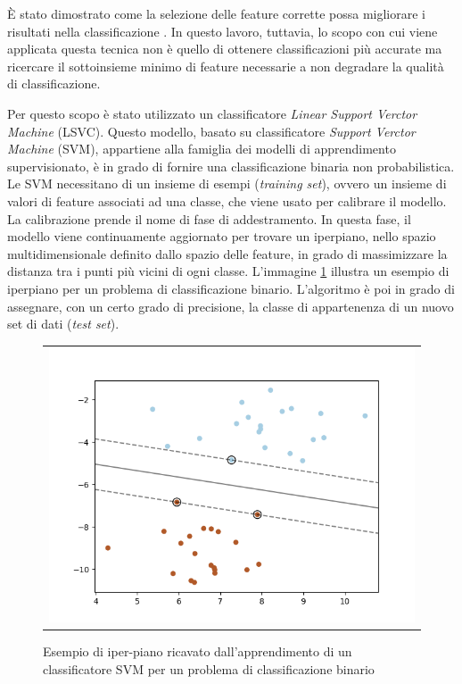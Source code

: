 \uppercase{è} stato dimostrato come la selezione delle feature corrette possa migliorare i risultati nella classificazione \cite{guyon2002gene}. In questo lavoro, tuttavia, lo scopo con cui viene applicata questa tecnica non è quello di ottenere classificazioni più accurate ma ricercare il sottoinsieme minimo di feature necessarie a non degradare la qualità di classificazione.

Per questo scopo è stato utilizzato un classificatore \emph{Linear Support Verctor Machine} (LSVC). Questo modello, basato su classificatore \emph{Support Verctor Machine} (SVM), appartiene alla famiglia dei modelli di apprendimento supervisionato, è in grado di fornire una classificazione binaria non probabilistica. Le SVM necessitano di un insieme di esempi (\emph{training set}), ovvero un insieme di valori di feature associati ad una classe, che viene usato per calibrare il modello. La calibrazione prende il nome di fase di addestramento. In questa fase, il modello viene continuamente aggiornato per trovare un iperpiano, nello spazio multidimensionale definito dallo spazio delle feature, in grado di massimizzare la distanza tra i punti più vicini di ogni classe. L'immagine \ref{img:svm_hyperplane} illustra un esempio di iperpiano per un problema di classificazione binario. L'algoritmo è poi in grado di assegnare, con un certo grado di precisione, la classe di appartenenza di un nuovo set di dati (\emph{test set}).

\begin{figure}
\begin{tabular}{c}
 \includegraphics[width=.65\textwidth]{img/svm_hyperplane.png}
\end{tabular}
\caption{Esempio di iper-piano ricavato dall'apprendimento di un classificatore SVM per un problema di classificazione binario}
\label{img:svm_hyperplane}
\end{figure}

